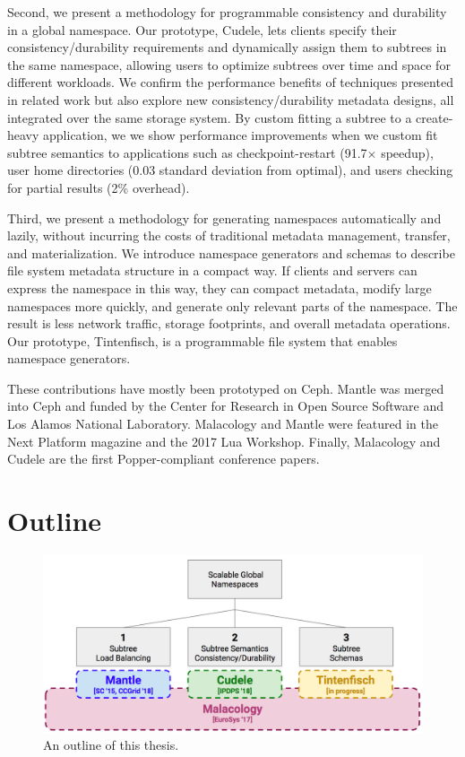 Second, we present a methodology for programmable consistency and durability in
a global namespace. Our prototype, Cudele, lets clients specify their
consistency/durability requirements and dynamically assign them to subtrees in
the same namespace, allowing users to optimize subtrees over time and space for
different workloads. We confirm the performance benefits of techniques
presented in related work but also explore new consistency/durability metadata
designs, all integrated over the same storage system. By custom fitting a
subtree to a create-heavy application, we we show performance improvements when
we custom fit subtree semantics to applications such as checkpoint-restart
(91.7\(\times\) speedup), user home directories (0.03 standard deviation from
optimal), and users checking for partial results (2\% overhead).

Third, we present a methodology for generating namespaces automatically and
lazily, without incurring the costs of traditional metadata management,
transfer, and materialization.  We introduce namespace generators and schemas
to describe file system metadata structure in a compact way. If clients and
servers can express the namespace in this way, they can compact metadata,
modify large namespaces more quickly, and generate only relevant parts of the
namespace. The result is less network traffic, storage footprints, and overall
metadata operations.  Our prototype, Tintenfisch, is a programmable file system
that enables namespace generators.

These contributions have mostly been prototyped on Ceph. Mantle was merged into
Ceph and funded by the Center for Research in Open Source Software and Los
Alamos National Laboratory. Malacology and Mantle were featured in the Next
Platform magazine and the 2017 Lua Workshop. Finally, Malacology and Cudele are
the first Popper-compliant conference papers.

\section{Outline}

\begin{figure}[tb]
  \centering
  \includegraphics[width=1\textwidth]{./chapters/overview.png}
  \caption{An outline of this thesis.}
  \label{fig:thesis-overview}
\end{figure}


